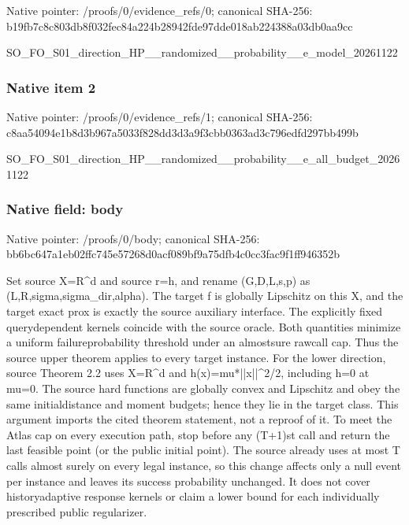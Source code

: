 \documentclass[10pt,a4paper]{article}
\begin{document}
Native pointer: /proofs/0/evidence\_refs/0; canonical SHA-256: b19fb7c8c803db8f032fec84\allowbreak{}a224b28942fde97dde018ab2\allowbreak{}24388a03db0aa9cc


SO\_FO\_S01\_direction\_HP\_\_\allowbreak{}randomized\_\_probability\_\allowbreak{}\_e\_model\_20261122


\subsubsection{Native item 2}


Native pointer: /proofs/0/evidence\_refs/1; canonical SHA-256: c8aa54094e1b8d3b967a5033\allowbreak{}f828dd3d3a9f3cbb0363ad3c\allowbreak{}796edfd297bb499b


SO\_FO\_S01\_direction\_HP\_\_\allowbreak{}randomized\_\_probability\_\allowbreak{}\_e\_all\_budget\_20261122


\subsubsection{Native field: body}


Native pointer: /proofs/0/body; canonical SHA-256: bb6bc647a1eb02ffc745e572\allowbreak{}68d0acf089bf9a75dfb4c0cc\allowbreak{}3fac9f1ff946352b


Set source X=R\textasciicircum{}d and source r=h, and rename (G,D,L,s,p) as (L,R,sigma,sigma\_dir,alpha). The target f is globally Lipschitz on this X, and the target exact prox is exactly the source auxiliary interface. The explicitly fixed querydependent kernels coincide with the source oracle. Both quantities minimize a uniform failureprobability threshold under an almostsure rawcall cap. Thus the source upper theorem applies to every target instance. For the lower direction, source Theorem 2.2 uses X=R\textasciicircum{}d and h(x)=mu*||x||\textasciicircum{}2/2, including h=0 at mu=0. The source hard functions are globally convex and Lipschitz and obey the same initialdistance and moment budgets; hence they lie in the target class. This argument imports the cited theorem statement, not a reproof of it. To meet the Atlas cap on every execution path, stop before any (T+1)st call and return the last feasible point (or the public initial point). The source already uses at most T calls almost surely on every legal instance, so this change affects only a null event per instance and leaves its success probability unchanged. It does not cover historyadaptive response kernels or claim a lower bound for each individually prescribed public regularizer.
\end{document}
